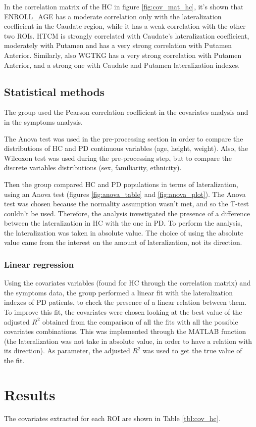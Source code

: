 \documentclass[]{article}
\begin{document}
\begin{multicols}{2}

In the correlation matrix of the HC in figure \ref{fig:cov_mat_hc}, it's shown that ENROLL\_AGE has a moderate correlation only with the lateralization coefficient in the Caudate region, while it has a weak correlation with the other two ROIs. HTCM is strongly correlated with Caudate's lateralization coefficient, moderately with Putamen and has a very strong correlation with Putamen Anterior. Similarly, also WGTKG has a very strong correlation with Putamen Anterior, and a strong one with Caudate and Putamen lateralization indexes.

\subsection{Statistical methods}

The group used the Pearson correlation coefficient in the covariates analysis and in the symptoms analysis.

The Anova test was used in the pre-processing section in order to compare the distributions of HC and PD continuous variables (age, height, weight).
Also, the Wilcoxon test was used during the pre-processing step, but to compare the discrete variables distributions (sex, familiarity, ethnicity).

Then the group compared HC and PD populations in terms of lateralization, using an Anova test (figures \ref{fig:anova_table} and \ref{fig:anova_plot}). The Anova test was chosen because the normality assumption wasn't met, and so the T-test couldn't be used.
Therefore, the analysis investigated the presence of a difference between the lateralization in HC with the one in PD. To perform the analysis, the lateralization was taken in absolute value. The choice of using the absolute value came from the interest on the amount of lateralization, not its direction.

\subsubsection{Linear regression}

Using the covariates variables (found for HC through the correlation matrix) and the symptoms data, the group performed a linear fit with the lateralization indexes of PD patients, to check the presence of a linear relation between them. To improve this fit, the covariates were chosen looking at the best value of the adjusted $R^2$ obtained from the comparison of all the fits with all the possible covariates combinations. 
This was implemented through the MATLAB function  (the lateralization was not take in absolute value, in order to have a relation with its direction).
As parameter, the adjusted $R^2$ was used to get the true value of the fit.

\section{Results}

The covariates extracted for each ROI are shown in Table \ref{tbl:cov_hc}.

\end{multicols}
\end{document}
